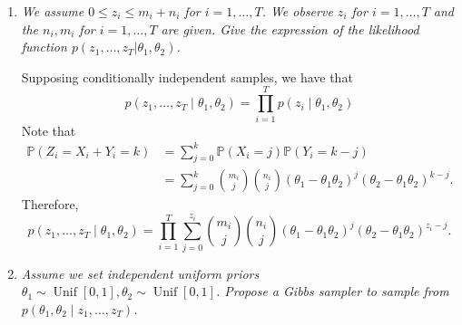\documentclass[a4paper,12pt]{article}
\newcommand{\unif}{\operatorname{Unif}}
\newcommand{\pr}{\mathbb{P}}
\theoremstyle{definition}
\begin{document}
\begin{enumerate}
    \item {\it We assume $0 \le z_i \le m_i + n_i$ for $i = 1, \dots , T$. We
    observe $z_i$ for $i = 1,\dots, T$ and the $n_i , m_i$ for
    $i = 1, \dots, T$ are given. Give the expression of the likelihood
    function $p(z_1, \dots, z_T| \theta_1, \theta_2)$.}
    
    Supposing conditionally independent samples, we have that 
    $$
    p(z_1, \dots, z_T \mid \theta_1, \theta_2) = \prod_{i=1}^T p(z_i\mid \theta_1, \theta_2)
    $$
    Note that 
    \begin{equation*}
        \begin{split}
            \pr(Z_i = X_i + Y_i = k) &= \sum_{j=0}^k \pr(X_i = j)\pr(Y_i = k-j) \\
            &= \sum_{j=0}^k \binom{m_i}{j}\binom{n_i}{j} (\theta_1-\theta_1\theta_2)^j(\theta_2-\theta_1\theta_2)^{k-j}. 
        \end{split}
    \end{equation*}
    Therefore, 
    $$
    p(z_1, \dots, z_T \mid \theta_1, \theta_2) = \prod_{i=1}^T \sum_{j=0}^{z_i} \binom{m_i}{j}\binom{n_i}{j} (\theta_1-\theta_1\theta_2)^j(\theta_2-\theta_1\theta_2)^{z_i-j}.
    $$

    \item {\it Assume we set independent uniform priors $\theta_1 \sim
    \unif[0,1], \theta_2 \sim \unif[0,1]$. Propose a Gibbs sampler to sample from $p( \theta_1 , \theta_2 \mid z_1 , \dots, z_T)$.}
    

\end{enumerate}
\end{document}
